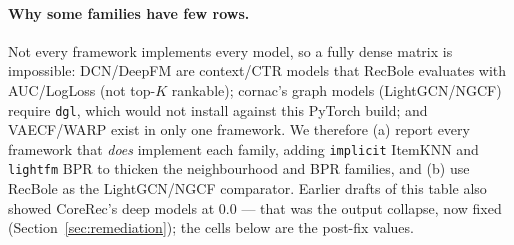 \documentclass[10pt]{article}
\begin{document}
\paragraph{Why some families have few rows.} Not every framework implements every
model, so a fully dense matrix is impossible: DCN/DeepFM are context/CTR models
that RecBole evaluates with AUC/LogLoss (not top-$K$ rankable); cornac's graph
models (LightGCN/NGCF) require \texttt{dgl}, which would not install against this
PyTorch build; and VAECF/WARP exist in only one framework. We therefore (a) report
every framework that \emph{does} implement each family, adding \texttt{implicit}
ItemKNN and \texttt{lightfm} BPR to thicken the neighbourhood and BPR families, and
(b) use RecBole as the LightGCN/NGCF comparator. Earlier drafts of this table also
showed CoreRec's deep models at $0.0$ --- that was the output collapse, now fixed
(Section~\ref{sec:remediation}); the cells below are the post-fix values.
\end{document}
